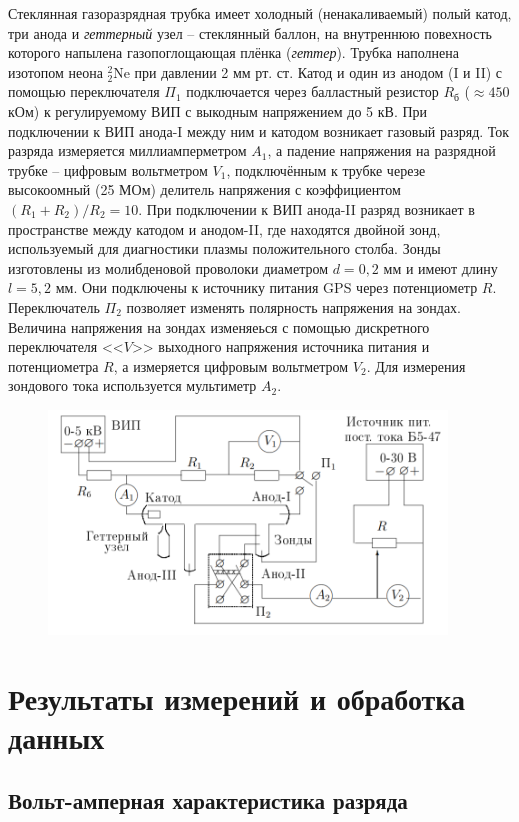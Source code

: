 \documentclass[a4paper]{article}
\theoremstyle{definition}
\theoremstyle{remark}
\begin{document}
    Стеклянная газоразрядная трубка имеет холодный (ненакаливаемый) полый катод, три анода и \textit{геттерный} узел -- стеклянный баллон, на внутреннюю повехность которого напылена газопоглощающая плёнка (\textit{геттер}). Трубка наполнена изотопом неона $^2_2$Ne при давлении 2 мм рт. ст. Катод и один из анодом (I и II) с помощью переключателя $\Pi_1$ подключается через балластный резистор $R_\text{б}$ ($\approx 450$ кОм) к регулируемому ВИП с выкодным напряжением до 5 кВ.
    При подключении к ВИП анода-I между ним и катодом возникает газовый разряд. Ток разряда измеряется миллиамперметром $A_1$, а падение напряжения на разрядной трубке -- цифровым вольтметром $V_1$, подключённым к трубке черезе высокоомный (25 МОм) делитель напряжения с коэффициентом $(R_1+R_2)/R_2 = 10$.
    При подключении к ВИП анода-II разряд возникает в пространстве между катодом и анодом-II, где находятся двойной зонд, используемый для диагностики плазмы положительного столба. Зонды изготовлены из молибденовой проволоки диаметром $d = 0,2$ мм и имеют длину $l = 5,2$ мм. Они подключены к источнику питания GPS через потенциометр $R$. Переключатель $\Pi_2$ позволяет изменять полярность напряжения на зондах. Величина напряжения на зондах изменяеься с помощью дискретного переключателя <<$V$>> выходного напряжения источника питания и потенциометра $R$, а измеряется цифровым вольтметром $V_2$. Для измерения зондового тока используется мультиметр $A_2$.

    \begin{figure}[h!]
        \centering
        \includegraphics[width = 300pt]{image/scheme.png}
    \end{figure}

\section{Результаты измерений и обработка данных}

\subsection{Вольт-амперная характеристика разряда}
\end{document}
